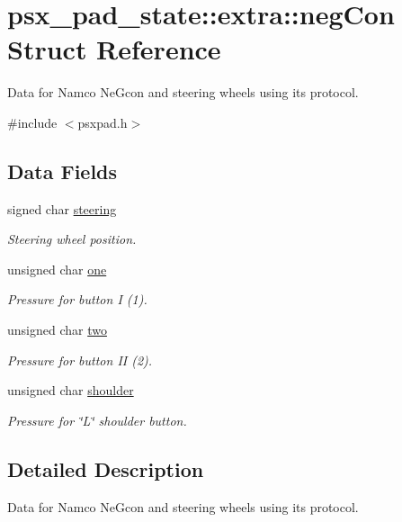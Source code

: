 \hypertarget{structpsx__pad__state_1_1extra_1_1negCon}{}\section{psx\+\_\+pad\+\_\+state\+:\+:extra\+:\+:neg\+Con Struct Reference}
\label{structpsx__pad__state_1_1extra_1_1negCon}


Data for Namco Ne\+Gcon and steering wheels using its protocol.  




{\ttfamily \#include $<$psxpad.\+h$>$}

\subsection*{Data Fields}
\begin{DoxyCompactItemize}
\item 
signed char \hyperlink{structpsx__pad__state_1_1extra_1_1negCon_a2b80fffb7562cb5e49a27b39abf6d801}{steering}
\begin{DoxyCompactList}\small\item\em Steering wheel position. \end{DoxyCompactList}\item 
unsigned char \hyperlink{structpsx__pad__state_1_1extra_1_1negCon_ab92a6ae63fc0da597e8c07ad393d6d44}{one}
\begin{DoxyCompactList}\small\item\em Pressure for button I (1). \end{DoxyCompactList}\item 
unsigned char \hyperlink{structpsx__pad__state_1_1extra_1_1negCon_a10c325e774816864fcff176eeb29ba41}{two}
\begin{DoxyCompactList}\small\item\em Pressure for button II (2). \end{DoxyCompactList}\item 
unsigned char \hyperlink{structpsx__pad__state_1_1extra_1_1negCon_aaf8cb3aec1ced04942adaca02b55e7a4}{shoulder}
\begin{DoxyCompactList}\small\item\em Pressure for \char`\"{}\+L\char`\"{} shoulder button. \end{DoxyCompactList}\end{DoxyCompactItemize}


\subsection{Detailed Description}
Data for Namco Ne\+Gcon and steering wheels using its protocol. 

